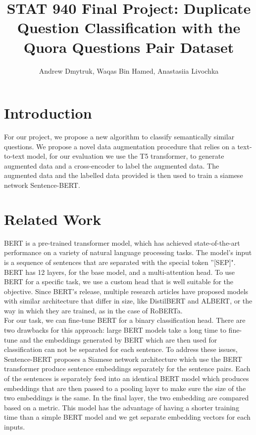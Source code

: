 \documentclass[11pt, oneside]{article}   	%
\title{STAT 940 Final Project: Duplicate Question Classification with the Quora Questions Pair Dataset}
\author{Andrew Dmytruk, Waqas Bin Hamed, Anastasiia Livochka}
\begin{document}
\maketitle

\newpage
\section{Introduction}

For our project, we propose a new algorithm to classify semantically similar questions. We propose a novel data augmentation procedure that relies on a text-to-text model, for our evaluation we use the T5 transformer, to generate augmented data and a cross-encoder to label the augmented data. The augmented data and the labelled data provided is then used to train a siamese network Sentence-BERT. \\


\section{Related Work}

BERT is a pre-trained transformer model, which has achieved state-of-the-art performance on a variety of natural language processing tasks. The model's input is a sequence of sentences that are separated with the special token ''[SEP]". BERT has 12 layers, for the base model, and a multi-attention head. To use BERT for a specific task, we use a custom head that is well suitable for the objective. Since BERT's release, multiple research articles have proposed models with similar architecture that differ in size, like DistilBERT and ALBERT, or the way in which they are trained, as in the case of RoBERTa. \\

\noindent For our task, we can fine-tune BERT for a binary classification head. There are two drawbacks for this approach: large BERT models take a long time to fine-tune and the embeddings generated by BERT which are then used for classification can not be separated for each sentence. To address these issues, Sentence-BERT proposes a Siamese network architecture which use the BERT transformer produce sentence embeddings separately for the sentence pairs. Each of the sentences is separately feed into an identical BERT model which produces embeddings that are then passed to a pooling layer to make sure the size of the two embeddings is the same. In the final layer, the two embedding are compared based on a metric. This model has the advantage of having a shorter training time than a simple BERT model and we get separate embedding vectors for each inputs. \\
\end{document}
